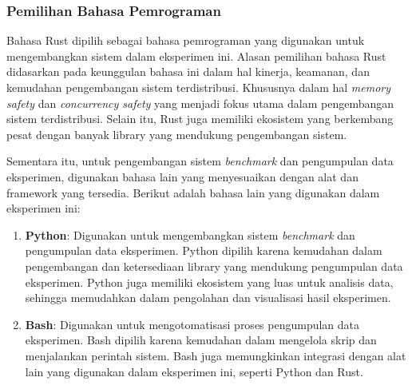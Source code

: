 \subsubsection{Pemilihan Bahasa Pemrograman}
\label{subsubsection:pilihan-bahasa-pemrograman}

Bahasa Rust dipilih sebagai bahasa pemrograman yang digunakan untuk mengembangkan sistem dalam eksperimen ini. Alasan pemilihan bahasa Rust didasarkan pada keunggulan bahasa ini dalam hal kinerja, keamanan, dan kemudahan pengembangan sistem terdistribusi. Khususnya dalam hal \textit{memory safety} dan \textit{concurrency safety} yang menjadi fokus utama dalam pengembangan sistem terdistribusi. Selain itu, Rust juga memiliki ekosistem yang berkembang pesat dengan banyak library yang mendukung pengembangan sistem.

Sementara itu, untuk pengembangan sistem \textit{benchmark} dan pengumpulan data eksperimen, digunakan bahasa lain yang menyesuaikan dengan alat dan framework yang tersedia. Berikut adalah bahasa lain yang digunakan dalam eksperimen ini:
\begin{enumerate}
    \item \textbf{Python}: Digunakan untuk mengembangkan sistem \textit{benchmark} dan pengumpulan data eksperimen. Python dipilih karena kemudahan dalam pengembangan dan ketersediaan library yang mendukung pengumpulan data eksperimen. Python juga memiliki ekosistem yang luas untuk analisis data, sehingga memudahkan dalam pengolahan dan visualisasi hasil eksperimen.
    \item \textbf{Bash}: Digunakan untuk mengotomatisasi proses pengumpulan data eksperimen. Bash dipilih karena kemudahan dalam mengelola skrip dan menjalankan perintah sistem. Bash juga memungkinkan integrasi dengan alat lain yang digunakan dalam eksperimen ini, seperti Python dan Rust.
\end{enumerate}